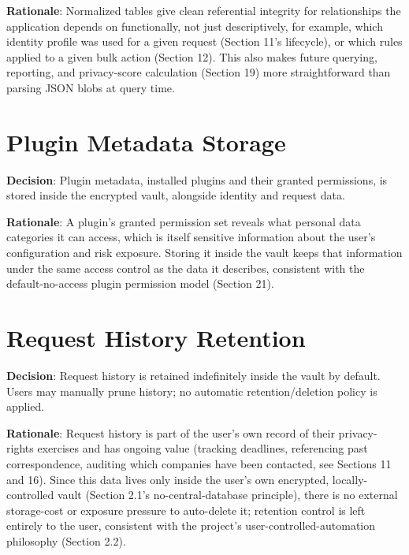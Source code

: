 \textbf{Rationale}:  Normalized tables give clean referential integrity for relationships the application depends on functionally, not just descriptively, for example, which identity profile was used for a given request (Section 11's lifecycle), or which rules applied to a given bulk action (Section 12). This also makes future querying, reporting, and privacy-score calculation (Section 19) more straightforward than parsing JSON blobs at query time.
\section{Plugin Metadata Storage}
\textbf{Decision}:  Plugin metadata, installed plugins and their granted permissions, is stored inside the encrypted vault, alongside identity and request data.

\textbf{Rationale}:  A plugin's granted permission set reveals what personal data categories it can access, which is itself sensitive information about the user's configuration and risk exposure. Storing it inside the vault keeps that information under the same access control as the data it describes, consistent with the default-no-access plugin permission model (Section 21).
\section{Request History Retention}
\textbf{Decision}:  Request history is retained indefinitely inside the vault by default. Users may manually prune history; no automatic retention/deletion policy is applied.

\textbf{Rationale}:  Request history is part of the user's own record of their privacy-rights exercises and has ongoing value (tracking deadlines, referencing past correspondence, auditing which companies have been contacted, see Sections 11 and 16). Since this data lives only inside the user's own encrypted, locally-controlled vault (Section 2.1's no-central-database principle), there is no external storage-cost or exposure pressure to auto-delete it; retention control is left entirely to the user, consistent with the project's user-controlled-automation philosophy (Section 2.2).

\sentinelchapterend